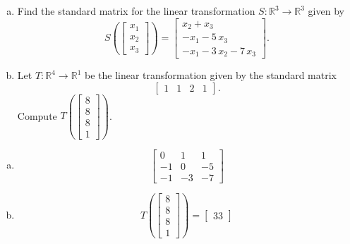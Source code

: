 
\begin{exerciseStatement}

\begin{enumerate}[(a)]
\item Find the standard matrix for the linear transformation \(S:\mathbb{R}^ 3  \to \mathbb{R}^ 3 \) given by \[S\left(  \left[\begin{array}{c}
x_{1} \\
x_{2} \\
x_{3}
\end{array}\right]  \right) =  \left[\begin{array}{c}
x_{2} + x_{3} \\
-x_{1} - 5 \, x_{3} \\
-x_{1} - 3 \, x_{2} - 7 \, x_{3}
\end{array}\right] .\]
\item Let \(T:\mathbb{R}^ 4  \to \mathbb{R}^ 1 \) be the linear transformation given by the standard matrix \[ \left[\begin{array}{cccc}
1 & 1 & 2 & 1
\end{array}\right] .\] Compute \(T\left( \left[\begin{array}{c}
8 \\
8 \\
8 \\
1
\end{array}\right]  \right)\). 
\end{enumerate}
    
\end{exerciseStatement}
    
\begin{exerciseAnswer} 

\begin{enumerate}[(a)]
\item \[ \left[\begin{array}{ccc}
0 & 1 & 1 \\
-1 & 0 & -5 \\
-1 & -3 & -7
\end{array}\right] \]
\item \[T\left( \left[\begin{array}{c}
8 \\
8 \\
8 \\
1
\end{array}\right]  \right)= \left[\begin{array}{c}
33
\end{array}\right] \]
\end{enumerate}
    
\end{exerciseAnswer}
    

